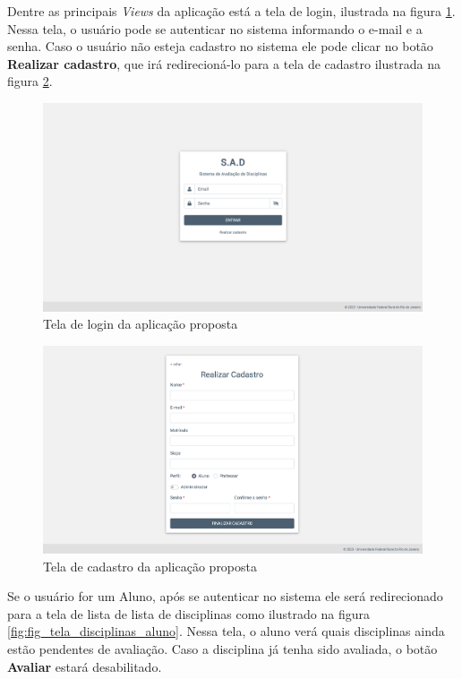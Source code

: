 Dentre as principais \textit{Views} da aplicação está a tela de login, ilustrada na figura \ref{fig:fig_tela_login}. Nessa tela, o usuário pode se autenticar no sistema informando o e-mail e a senha. Caso o usuário não esteja cadastro no sistema ele pode clicar no botão \textbf{Realizar cadastro}, que irá redirecioná-lo para a tela de cadastro ilustrada na figura \ref{fig:fig_tela_cadastro}.

\begin{figure}[h]
  \centering
  \includegraphics[width=1\textwidth]{imagens/tela-login.png}
  \caption{Tela de login da aplicação proposta}
  \label{fig:fig_tela_login}
\end{figure}

\begin{figure}[!htb]
  \centering
  \includegraphics[width=1\textwidth]{imagens/tela-cadastro.png}
  \caption{Tela de cadastro da aplicação proposta}
  \label{fig:fig_tela_cadastro}
\end{figure}

Se o usuário for um Aluno, após se autenticar no sistema ele será redirecionado para a tela de lista de lista de disciplinas como ilustrado na figura \ref{fig:fig_tela_disciplinas_aluno}. Nessa tela, o aluno verá quais disciplinas ainda estão pendentes de avaliação. Caso a disciplina já tenha sido avaliada, o botão \textbf{Avaliar} estará desabilitado.

